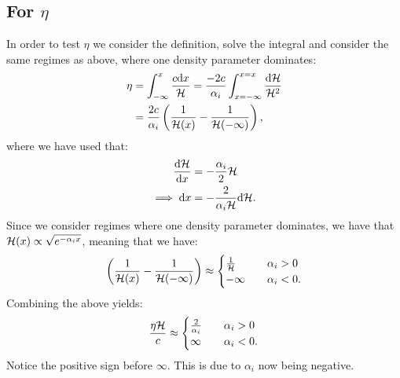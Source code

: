 \subsection{For $\eta$}
    In order to test $\eta$ we consider the definition, solve the integral and consider the same regimes as above, where one density parameter dominates:
    \begin{equation}
        \begin{split}
            \eta &= \int_{-\infty}^x \frac{c\mathrm{d} x}{\mathcal{H}} = \frac{-2c}{\alpha_i}\int_{x=-\infty}^{x=x}\frac{\mathrm{d}\mathcal{H}}{\mathcal{H}^2} \\
            &= \frac{2c}{\alpha_i}\left(\frac{1}{\mathcal{H}(x)}-\frac{1}{\mathcal{H}(-\infty)}\right),
        \end{split}
    \end{equation}
    where we have used that:
    \begin{equation}
        \begin{split}
            \dv{\mathcal{H}}{x} &= -\frac{\alpha_i}{2}\mathcal{H} \\
            \implies \mathrm{d} x &= -\frac{2}{\alpha_i\mathcal{H}}\mathrm{d}\mathcal{H}.
        \end{split}
    \end{equation}
    Since we consider regimes where one density parameter dominates, we have that $\mathcal{H}(x)\propto \sqrt{e^{-\alpha_ix}}$, meaning that we have:
    \begin{equation}
        \left(\frac{1}{\mathcal{H}(x)}-\frac{1}{\mathcal{H}(-\infty)}\right) \approx 
        \begin{cases}
            \frac{1}{\mathcal{H}} \quad &\alpha_i>0 \\
            -\infty \quad &\alpha_i <0.
        \end{cases}
    \end{equation}
    Combining the above yields:
    \begin{equation}
        \frac{\eta\mathcal{H}}{c} \approx 
        \begin{cases}
            \frac{2}{\alpha_i} \quad &\alpha_i>0 \\
            \infty \quad &\alpha_i<0.
        \end{cases}
    \end{equation}
    Notice the positive sign before $\infty$. This is due to $\alpha_i$ now being negative. 
    
